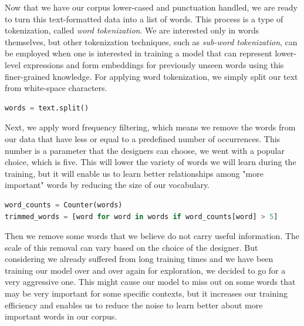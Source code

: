 Now that we have our corpus lower-cased and punctuation handled, we are ready to turn this text-formatted data into a list of words. This process is a type of tokenization, called \textit{word tokenization}. We are interested only in words themselves, but other tokenization techniques, such as \textit{sub-word tokenization}, can be employed when one is interested in training a model that can represent lower-level expressions and form embeddings for previously unseen words using this finer-grained knowledge. For applying word tokenization, we simply split our text from white-space characters.

\begin{lstlisting}[language=Python, caption=Word Tokenization]
words = text.split()
\end{lstlisting}

Next, we apply word frequency filtering, which means we remove the words from our data that have less or equal to a predefined number of occurrences. This number is a parameter that the designers can choose, we went with a popular choice, which is five. This will lower the variety of words we will learn during the training, but it will enable us to learn better relationships among "more important" words by reducing the size of our vocabulary.

\begin{lstlisting}[language=Python, caption=Word Frequency Filtering]
word_counts = Counter(words)
trimmed_words = [word for word in words if word_counts[word] > 5]
\end{lstlisting}

Then we remove some words that we believe do not carry useful information. The scale of this removal can vary based on the choice of the designer. But considering we already suffered from long training times and we have been training our model over and over again for exploration, we decided to go for a very aggressive one. This might cause our model to miss out on some words that may be very important for some specific contexts, but it increases our training efficiency and enables us to reduce the noise to learn better about more important words in our corpus.

